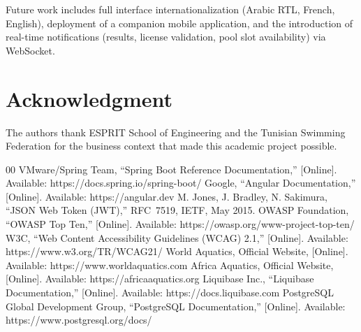 \documentclass[conference]{IEEEtran}
\begin{document}
Future work includes full interface internationalization (Arabic RTL, French, English), deployment of a companion mobile application, and the introduction of real-time notifications (results, license validation, pool slot availability) via WebSocket.

\section*{Acknowledgment}
The authors thank ESPRIT School of Engineering and the Tunisian Swimming Federation for the business context that made this academic project possible.

\begin{thebibliography}{00}
 VMware/Spring Team, ``Spring Boot Reference Documentation,'' [Online]. Available: https://docs.spring.io/spring-boot/
 Google, ``Angular Documentation,'' [Online]. Available: https://angular.dev
 M. Jones, J. Bradley, N. Sakimura, ``JSON Web Token (JWT),'' RFC~7519, IETF, May 2015.
 OWASP Foundation, ``OWASP Top Ten,'' [Online]. Available: https://owasp.org/www-project-top-ten/
 W3C, ``Web Content Accessibility Guidelines (WCAG) 2.1,'' [Online]. Available: https://www.w3.org/TR/WCAG21/
 World Aquatics, Official Website, [Online]. Available: https://www.worldaquatics.com
 Africa Aquatics, Official Website, [Online]. Available: https://africaaquatics.org
 Liquibase Inc., ``Liquibase Documentation,'' [Online]. Available: https://docs.liquibase.com
 PostgreSQL Global Development Group, ``PostgreSQL Documentation,'' [Online]. Available: https://www.postgresql.org/docs/
\end{thebibliography}
\end{document}
